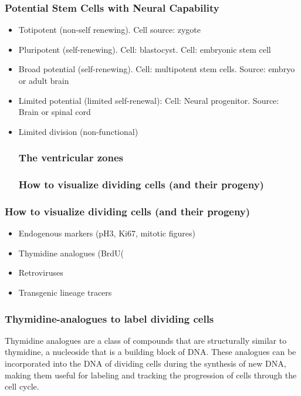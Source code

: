 \begin{itemize}
\begin{itemize}
\subsubsection{Potential Stem Cells with Neural Capability}
\begin{itemize}
    \item Totipotent (non-self renewing). Cell source: zygote
    \item Pluripotent (self-renewing). Cell: blastocyst. Cell: embryonic stem cell
    \item Broad potential (self-renewing). Cell: multipotent stem cells. Source: embryo or adult brain
    \item Limited potential (limited self-renewal): Cell: Neural progenitor. Source: Brain or spinal cord
    \item Limited division (non-functional)
    \subsubsection{The ventricular zones}
    \subsubsection{How to visualize dividing cells (and their progeny)}
    
\end{itemize}


\subsubsection{How to visualize dividing cells (and their progeny)}
\begin{itemize}
    \item Endogenous markers (pH3, Ki67, mitotic figures)
    \item Thymidine analogues (BrdU(
    \item Retroviruses
    \item Transgenic lineage tracers
\end{itemize}
\subsubsection{Thymidine-analogues to label dividing cells}
Thymidine analogues are a class of compounds that are structurally similar to thymidine, a nucleoside that is a building block of DNA. These analogues can be incorporated into the DNA of dividing cells during the synthesis of new DNA, making them useful for labeling and tracking the progression of cells through the cell cycle.


\end{itemize}
\end{itemize}
